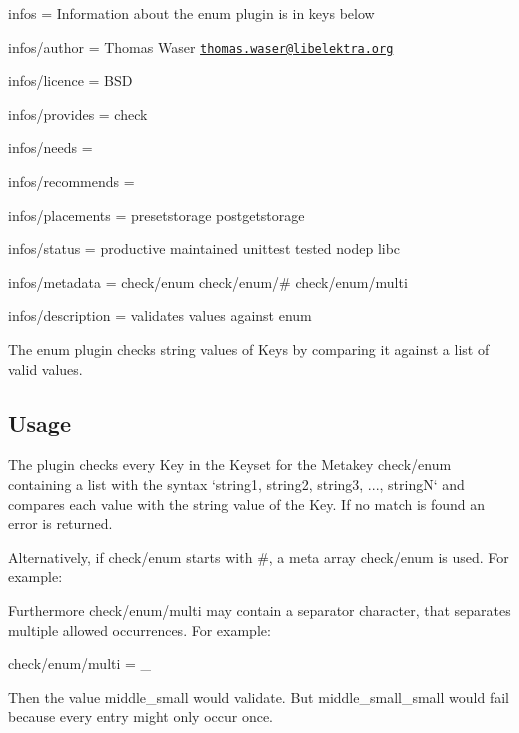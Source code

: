 
\begin{DoxyItemize}
\item infos = Information about the enum plugin is in keys below
\item infos/author = Thomas Waser \href{mailto:thomas.waser@libelektra.org}{\tt thomas.\+waser@libelektra.\+org}
\item infos/licence = B\+SD
\item infos/provides = check
\item infos/needs =
\item infos/recommends =
\item infos/placements = presetstorage postgetstorage
\item infos/status = productive maintained unittest tested nodep libc
\item infos/metadata = check/enum check/enum/\# check/enum/multi
\item infos/description = validates values against enum
\end{DoxyItemize}

The enum plugin checks string values of Keys by comparing it against a list of valid values.

\subsection*{Usage}

The plugin checks every Key in the Keyset for the Metakey {\ttfamily check/enum} containing a list with the syntax `\textquotesingle{}string1\textquotesingle{}, \textquotesingle{}string2\textquotesingle{}, \textquotesingle{}string3\textquotesingle{}, ..., \textquotesingle{}stringN\textquotesingle{}` and compares each value with the string value of the Key. If no match is found an error is returned.

Alternatively, if {\ttfamily check/enum} starts with {\ttfamily \#}, a meta array {\ttfamily check/enum} is used. For example\+: 


Furthermore {\ttfamily check/enum/multi} may contain a separator character, that separates multiple allowed occurrences. For example\+: \begin{DoxyVerb}check/enum/multi = _
\end{DoxyVerb}


Then the value {\ttfamily middle\+\_\+small} would validate. But {\ttfamily middle\+\_\+small\+\_\+small} would fail because every entry might only occur once.

